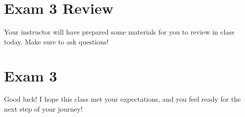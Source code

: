 
\chapter{Exam 3 Review}

Your instructor will have prepared some materials for you to review in class today.  Make sure to ask questions!

{\let\clearpage\relax\chapter{Exam 3}}

Good luck!  I hope this class met your expectations, and you feel ready for the next step of your journey!